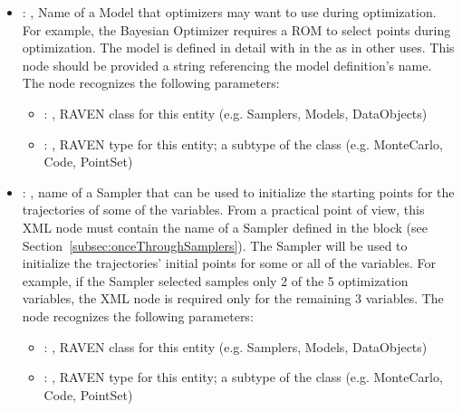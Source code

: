 \begin{itemize}
    \item {}: ,
      Name of a Model that optimizers may want to use during optimization. For example, the
      Bayesian Optimizer requires a ROM to select points during optimization. The model is defined
      in                                           detail with in the  as in other
      uses. This node should be provided a string referencing
      the model definition's name.
      The  node recognizes the following parameters:
        \begin{itemize}
          \item {}: ,
            RAVEN class for this entity (e.g. Samplers, Models, DataObjects)
          \item {}: ,
            RAVEN type for this entity; a subtype of the class (e.g. MonteCarlo, Code, PointSet)
      \end{itemize}

    \item {}: ,
      name of a Sampler that can be used to initialize the starting points for the trajectories
      of some of the variables. From a practical point of view, this XML node must contain the
      name of a Sampler defined in the  block (see
      Section~\ref{subsec:onceThroughSamplers}).               The Sampler will be used to
      initialize the trajectories' initial points for some or all               of the variables.
      For example, if the Sampler selected samples only 2 of the 5 optimization
      variables, the  XML node is required only for the remaining 3 variables.
      The  node recognizes the following parameters:
        \begin{itemize}
          \item {}: ,
            RAVEN class for this entity (e.g. Samplers, Models, DataObjects)
          \item {}: ,
            RAVEN type for this entity; a subtype of the class (e.g. MonteCarlo, Code, PointSet)
      \end{itemize}


\end{itemize}

